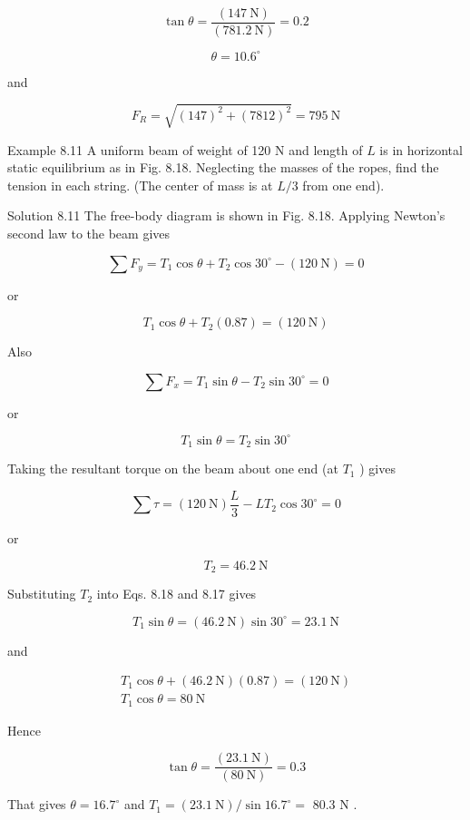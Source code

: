 \documentclass[10pt]{article}
\begin{document}
$$
\tan \theta=\frac{(147 \mathrm{~N})}{(781.2 \mathrm{~N})}=0.2
$$

$$
\theta=10.6^{\circ}
$$

and

$$
F_{R}=\sqrt{(147)^{2}+(7812)^{2}}=795 \mathrm{~N}
$$

Example 8.11 A uniform beam of weight of 120 N and length of $L$ is in horizontal static equilibrium as in Fig. 8.18. Neglecting the masses of the ropes, find the tension in each string. (The center of mass is at $L / 3$ from one end).

Solution 8.11 The free-body diagram is shown in Fig. 8.18. Applying Newton's second law to the beam gives

$$
\sum F_{y}=T_{1} \cos \theta+T_{2} \cos 30^{\circ}-(120 \mathrm{~N})=0
$$

or


\begin{equation*}
T_{1} \cos \theta+T_{2}(0.87)=(120 \mathrm{~N}) \tag{8.17}
\end{equation*}


Also

$$
\sum F_{x}=T_{1} \sin \theta-T_{2} \sin 30^{\circ}=0
$$

or


\begin{equation*}
T_{1} \sin \theta=T_{2} \sin 30^{\circ} \tag{8.18}
\end{equation*}


Taking the resultant torque on the beam about one end (at $T_{1}$ ) gives

$$
\sum \tau=(120 \mathrm{~N}) \frac{L}{3}-L T_{2} \cos 30^{\circ}=0
$$

or

$$
T_{2}=46.2 \mathrm{~N}
$$

Substituting $T_{2}$ into Eqs. 8.18 and 8.17 gives

$$
T_{1} \sin \theta=(46.2 \mathrm{~N}) \sin 30^{\circ}=23.1 \mathrm{~N}
$$

and

$$
\begin{gathered}
T_{1} \cos \theta+(46.2 \mathrm{~N})(0.87)=(120 \mathrm{~N}) \\
T_{1} \cos \theta=80 \mathrm{~N}
\end{gathered}
$$

Hence

$$
\tan \theta=\frac{(23.1 \mathrm{~N})}{(80 \mathrm{~N})}=0.3
$$

That gives $\theta=16.7^{\circ}$ and $T_{1}=(23.1 \mathrm{~N}) / \sin 16.7^{\circ}=$ 80.3 N .
\end{document}
